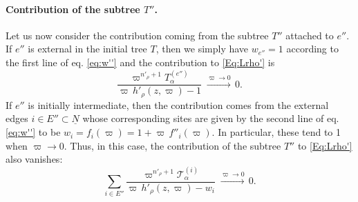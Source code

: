 \documentclass{article}
\begin{document}
\paragraph{Contribution of the subtree $T''$.} Let us now consider the contribution coming from the subtree $T''$ attached to $e''$. If $e''$ is external in the initial tree $T$, then we simply have $w_{e''} = 1$ according to the first line of eq. \eqref{eq:w''} and the contribution to \eqref{Eq:Lrho'} is
\begin{equation}
\frac{\varpi^{n'_\rho+1}T_\alpha^{(e'')}}{\varpi\,h'_\rho(z,\varpi) - 1} \; \xrightarrow{\varpi\to 0} \, 0.
\end{equation}
If $e''$ is initially intermediate, then the contribution comes from the external edges $i \in E''\subset\underline{N}$ whose corresponding sites are given by the second line of eq. \eqref{eq:w''} to be $w_{i} = f_i(\varpi) = 1 + \varpi\,f''_{i}(\varpi)$. In particular, these tend to 1 when $\varpi\to0$. Thus, in this case, the contribution of the subtree $T''$ to \eqref{Eq:Lrho'} also vanishes:
\begin{equation}
\sum_{i \in E''} \frac{\varpi^{n'_{\rho}+1}\mathcal{T}_\alpha^{(i)}}{\varpi\,h'_\rho(z,\varpi) - w_{i}} \; \xrightarrow{\varpi\to 0} \, 0.
\end{equation}
\end{document}
